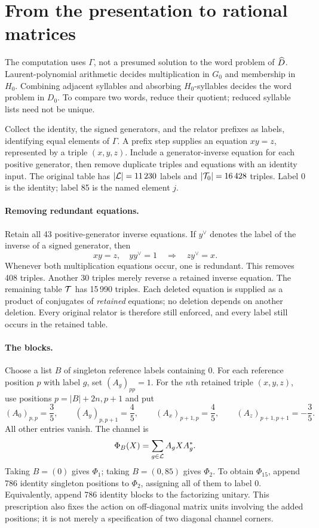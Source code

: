 \documentclass[11pt]{article}
\begin{document}
\section{From the presentation to rational matrices}\label{sec:channel}

The computation uses $\Gamma$, not a presumed solution to the word problem of $\widehat D$.
Laurent-polynomial arithmetic decides multiplication in $G_0$ and membership in $H_0$.
Combining adjacent syllables and absorbing $H_0$-syllables decides the word problem in
$D_0$. To compare two words, reduce their quotient; reduced syllable lists need not be
unique.

Collect the identity, the signed generators, and the relator prefixes as labels, identifying
equal elements of $\Gamma$. A prefix step supplies an equation $xy=z$, represented by a
triple $(x,y,z)$. Include a generator-inverse equation for each positive generator, then
remove duplicate triples and equations with an identity input. The original table has
$|\mathcal L|=11\,230$ labels and $|\mathcal T_0|=16\,428$ triples. Label 0 is the identity; label
85 is the named element $j$.

\paragraph{Removing redundant equations.}
Retain all 43 positive-generator inverse equations. If $y^\vee$ denotes the label of the
inverse of a signed generator, then
\[
 xy=z,\quad yy^\vee=1\quad\Longrightarrow\quad zy^\vee=x.
\]
Whenever both multiplication equations occur, one is redundant. This removes 408 triples.
Another 30 triples merely reverse a retained inverse equation. The remaining table $\mathcal T$
has 15\,990 triples. Each deleted equation is supplied as a product of conjugates of
\emph{retained} equations; no deletion depends on another deletion. Every original relator
is therefore still enforced, and every label still occurs in the retained table.

\paragraph{The blocks.}
Choose a list $B$ of singleton reference labels containing 0. For each reference position
$p$ with label $g$, set $(A_g)_{pp}=1$. For the $n$th retained triple $(x,y,z)$, use positions
$p=|B|+2n,p+1$ and put
\begin{equation}
 (A_0)_{p,p}=\frac35,\qquad (A_y)_{p,p+1}=\frac45,\qquad
 (A_x)_{p+1,p}=\frac45,\qquad (A_z)_{p+1,p+1}=-\frac35.
 \label{eq:kraus-block}
\end{equation}
All other entries vanish. The channel is
\begin{equation}
 \Phi_B(X)=\sum_{g\in\mathcal L}A_gXA_g^*.\label{eq:channel}
\end{equation}
Taking $B=(0)$ gives $\Phi_1$; taking $B=(0,85)$ gives $\Phi_2$.
To obtain $\Phi_{15}$, append 786 identity singleton positions to $\Phi_2$, assigning all
of them to label 0. Equivalently, append 786 identity blocks to the factorizing unitary.
This prescription also fixes the action on off-diagonal matrix units involving the added
positions; it is not merely a specification of two diagonal channel corners.
\end{document}
